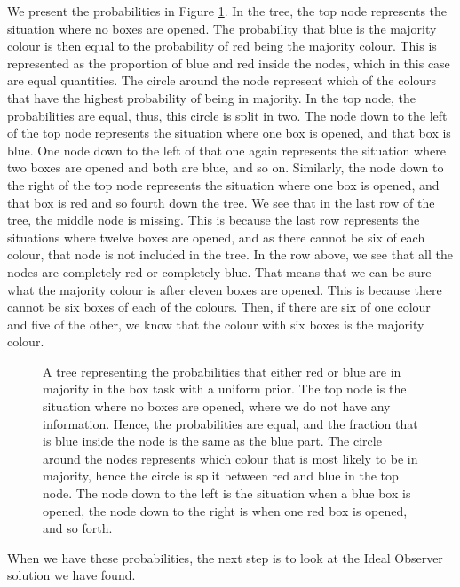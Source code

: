 We present the probabilities in Figure \ref{fig:probability_gamma_kappa_1}. In the tree, the top node represents the situation where no boxes are opened. The probability that blue is the majority colour is then equal to the probability of red being the majority colour. This is represented as the proportion of blue and red inside the nodes, which in this case are equal quantities. The circle around the node represent which of the colours that have the highest probability of being in majority. In the top node, the probabilities are equal, thus, this circle is split in two. The node down to the left of the top node represents the situation where one box is opened, and that box is blue. One node down to the left of that one again represents the situation where two boxes are opened and both are blue, and so on. Similarly, the node down to the right of the top node represents the situation where one box is opened, and that box is red and so fourth down the tree. We see that in the last row of the tree, the middle node is missing. This is because the last row represents the situations where twelve boxes are opened, and as there cannot be six of each colour, that node is not included in the tree. In the row above, we see that all the nodes are completely red or completely blue. That means that we can be sure what the majority colour is after eleven boxes are opened. This is because there cannot be six boxes of each of the colours. Then, if there are six of one colour and five of the other, we know that the colour with six boxes is the majority colour. 
\begin{figure}
    \centering
    \scalebox{0.4}{}
    \caption[The probabilities of majority colour plotted. $\gamma=\kappa=1$]{A tree representing the probabilities that either red or blue are in majority in the box task with a uniform prior. The top node is the situation where no boxes are opened, where we do not have any information. Hence, the probabilities are equal, and the fraction that is blue inside the node is the same as the blue part. The circle around the nodes represents which colour that is most likely to be in majority, hence the circle is split between red and blue in the top node. The node down to the left is the situation when a blue box is opened, the node down to the right is when one red box is opened, and so forth.}
    \label{fig:probability_gamma_kappa_1}
\end{figure}



When we have these probabilities, the next step is to look at the Ideal Observer solution we have found.




